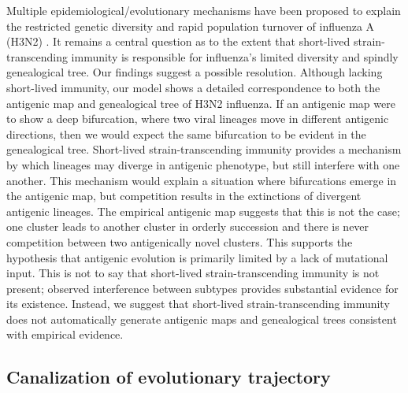 \documentclass[11pt,oneside,letterpaper]{article}
\begin{document}
Multiple epidemiological/evolutionary mechanisms have been proposed to explain the restricted genetic diversity and rapid population turnover of influenza A (H3N2) \cite{Ferguson03,Tria05,Koelle06,Recker07}.  It remains a central question as to the extent that short-lived strain-transcending immunity is responsible for influenza's limited diversity and spindly genealogical tree.  Our findings suggest a possible resolution.  Although lacking short-lived immunity, our model shows a detailed correspondence to both the antigenic map and genealogical tree of H3N2 influenza.  If an antigenic map were to show a deep bifurcation, where two viral lineages move in different antigenic directions, then we would expect the same bifurcation to be evident in the genealogical tree.  Short-lived strain-transcending immunity provides a mechanism by which lineages may diverge in antigenic phenotype, but still interfere with one another.  This mechanism would explain a situation where bifurcations emerge in the antigenic map, but competition results in the extinctions of divergent antigenic lineages.  The empirical antigenic map \cite{Smith04} suggests that this is not the case; one cluster leads to another cluster in orderly succession and there is never competition between two antigenically novel clusters.  This supports the hypothesis that antigenic evolution is primarily limited by a lack of mutational input.  This is not to say that short-lived strain-transcending immunity is not present; observed interference between subtypes \cite{Ferguson03,Goldstein11} provides substantial evidence for its existence.  Instead, we suggest that short-lived strain-transcending immunity does not automatically generate antigenic maps and genealogical trees consistent with empirical evidence.

\subsection*{Canalization of evolutionary trajectory}
\end{document}
